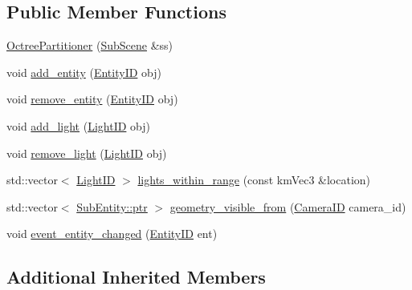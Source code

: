 \subsection*{Public Member Functions}
\begin{DoxyCompactItemize}
\item 
\hyperlink{classkglt_1_1_octree_partitioner_aba18d9460e3362c4e7d3e2974533f00c}{Octree\-Partitioner} (\hyperlink{classkglt_1_1_sub_scene}{Sub\-Scene} \&ss)
\item 
void \hyperlink{classkglt_1_1_octree_partitioner_a3f0eceb85e9b68bd3afb3caa2e448ada}{add\-\_\-entity} (\hyperlink{namespacekglt_a693458ae13c224ae3ea4074ac3a0b02a}{Entity\-I\-D} obj)
\item 
void \hyperlink{classkglt_1_1_octree_partitioner_a2fa41bcdbda4f07c0b2f0eb945bd9763}{remove\-\_\-entity} (\hyperlink{namespacekglt_a693458ae13c224ae3ea4074ac3a0b02a}{Entity\-I\-D} obj)
\item 
void \hyperlink{classkglt_1_1_octree_partitioner_a46558d651be5a803c29b252f3b76a05d}{add\-\_\-light} (\hyperlink{namespacekglt_ab90464803ef8e3c1f6da41388e859968}{Light\-I\-D} obj)
\item 
void \hyperlink{classkglt_1_1_octree_partitioner_a1a38a1d3234ad083dcbff10eb354708f}{remove\-\_\-light} (\hyperlink{namespacekglt_ab90464803ef8e3c1f6da41388e859968}{Light\-I\-D} obj)
\item 
std\-::vector$<$ \hyperlink{namespacekglt_ab90464803ef8e3c1f6da41388e859968}{Light\-I\-D} $>$ \hyperlink{classkglt_1_1_octree_partitioner_aa8d802617db178acc794ffe379f7db8a}{lights\-\_\-within\-\_\-range} (const km\-Vec3 \&location)
\item 
std\-::vector$<$ \hyperlink{class_managed_a59aa857eaf753735f65130812e98e9a9}{Sub\-Entity\-::ptr} $>$ \hyperlink{classkglt_1_1_octree_partitioner_afc4a307bf9ab74ca44904d3abe2ce3c6}{geometry\-\_\-visible\-\_\-from} (\hyperlink{namespacekglt_a2a2b79f136b052b58ec737bd9c885429}{Camera\-I\-D} camera\-\_\-id)
\item 
void \hyperlink{classkglt_1_1_octree_partitioner_ab738a9eaedac25509f70f27c8fdb46dc}{event\-\_\-entity\-\_\-changed} (\hyperlink{namespacekglt_a693458ae13c224ae3ea4074ac3a0b02a}{Entity\-I\-D} ent)
\end{DoxyCompactItemize}
\subsection*{Additional Inherited Members}


